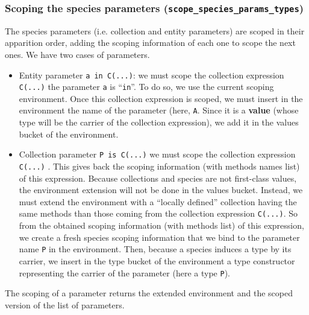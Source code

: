 \subsubsection{Scoping the species parameters ({\tt scope\_species\_params\_types})}
The species parameters (i.e. collection and entity parameters) are
scoped in their apparition order, adding the scoping information of
each one to scope the next ones. We have two cases of parameters.
\begin{itemize}
\item Entity parameter {\tt a in C(...)}: we must scope the collection
  expression {\tt C(...)} the parameter {\tt a} is ``{\tt in}''. To
  do so, we use the current scoping environment. Once this collection
  expression is scoped, we must insert in the environment the name of
  the parameter (here, {\tt A}. Since it is a {\bf value} (whose type
  will be the carrier of the collection expression), we add it in the
  values bucket of the environment.
\item Collection parameter {\tt P is C(...)} we must scope the
  collection expression {\tt C(...)} . This gives back the scoping
  information (with methods names list) of this expression. Because
  collections and species are not first-class values, the environment
  extension will not be done in the values bucket. Instead, we must
  extend the environment with a ``locally defined'' collection having
  the same methods than those coming from the collection expression
  {\tt C(...)}. So from the obtained scoping information (with methods
  list) of this expression, we create a fresh species scoping
  information that we bind to the parameter name {\tt P} in the
  environment. Then, because a species induces a type by its carrier,
  we insert in the type bucket of the environment a type constructor
  representing the carrier of the parameter (here a type {\tt P}).
\end{itemize}
The scoping of a parameter returns the extended environment and the
scoped version of the list of parameters.


